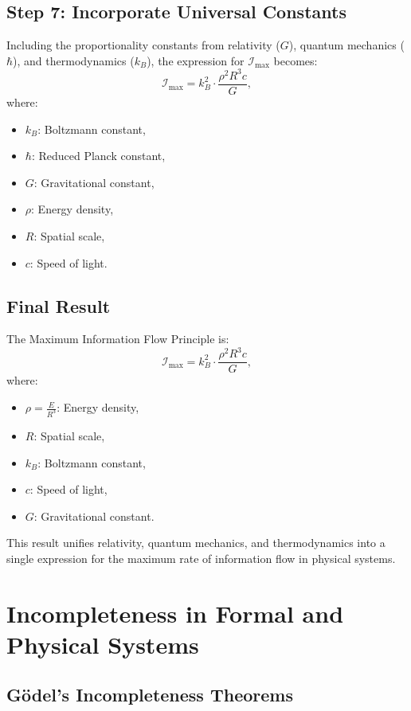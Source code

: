 \documentclass[12pt]{article}
\begin{document}
\subsection{Step 7: Incorporate Universal Constants}

Including the proportionality constants from relativity ($G$), quantum mechanics ($\hbar$), and thermodynamics ($k_B$), the expression for $\mathcal{I}_{\text{max}}$ becomes:
\[
\mathcal{I}_{\text{max}} = k_B^2 \cdot \frac{\rho^2 R^3 c}{G},
\]
where:
\begin{itemize}
    \item $k_B$: Boltzmann constant,
    \item $\hbar$: Reduced Planck constant,
    \item $G$: Gravitational constant,
    \item $\rho$: Energy density,
    \item $R$: Spatial scale,
    \item $c$: Speed of light.
\end{itemize}

\subsection{Final Result}

The Maximum Information Flow Principle is:
\[
\mathcal{I}_{\text{max}} = k_B^2 \cdot \frac{\rho^2 R^3 c}{G},
\]
where:
\begin{itemize}
    \item $\rho = \frac{E}{R^3}$: Energy density,
    \item $R$: Spatial scale,
    \item $k_B$: Boltzmann constant,
    \item $c$: Speed of light,
    \item $G$: Gravitational constant.
\end{itemize}
This result unifies relativity, quantum mechanics, and thermodynamics into a single expression for the maximum rate of information flow in physical systems.


\section{Incompleteness in Formal and Physical Systems}

\subsection{Gödel’s Incompleteness Theorems}
\end{document}

